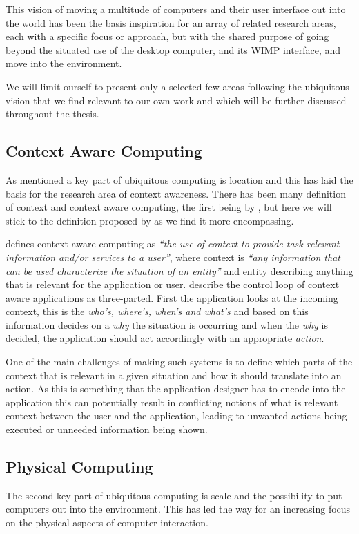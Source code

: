 This vision of moving a multitude of computers and their user interface out into the world has been the basis inspiration for an array of related research areas, each with a specific focus or approach, but with the shared purpose of going beyond the situated use of the desktop computer, and its WIMP interface, and move into the environment.

We will limit ourself to present only a selected few areas following the ubiquitous vision that we find relevant to our own work and which will be further discussed throughout the thesis.

\subsection{Context Aware Computing}
As mentioned a key part of ubiquitous computing is location and this has laid the basis for the research area of context awareness.
There has been many definition of context and context aware computing, the first being by \citet{schilit1994context}, but here we will stick to the definition proposed by \citeauthor{abowd1999towards} as we find it more encompassing. 

\citet{abowd1999towards} defines context-aware computing as \emph{``the use of context to
provide task-relevant information and/or services to a user''}, where context is \emph{``any information that can be used characterize the situation of an entity''} and entity describing anything that is relevant for the application or user.
\citeauthor{abowd1999towards} describe the control loop of context aware applications as three-parted. 
First the application looks at the incoming context, this is the \emph{who's, where's, when's and what's} and based on this information decides on a \emph{why} the situation is occurring and when the \emph{why} is decided, the application should act accordingly with an appropriate \emph{action}.

One of the main challenges of making such systems is to define which parts of the context that is relevant in a given situation and how it should translate into an action. 
As this is something that the application designer has to encode into the application this can potentially result in conflicting notions of what is relevant context between the user and the application, leading to unwanted actions being executed or unneeded information being shown.

\subsection{Physical Computing}
\label{interfaces:physical_computing}
The second key part of ubiquitous computing is scale and the possibility to put computers out into the environment.
This has led the way for an increasing focus on the physical aspects of computer interaction.


